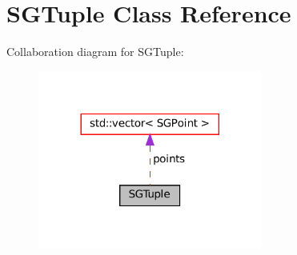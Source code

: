 \hypertarget{classSGTuple}{}\section{S\+G\+Tuple Class Reference}
\label{classSGTuple}


Collaboration diagram for S\+G\+Tuple\+:
\nopagebreak
\begin{figure}[H]
\begin{center}
\leavevmode
\includegraphics[width=209pt]{classSGTuple__coll__graph}
\end{center}
\end{figure}
